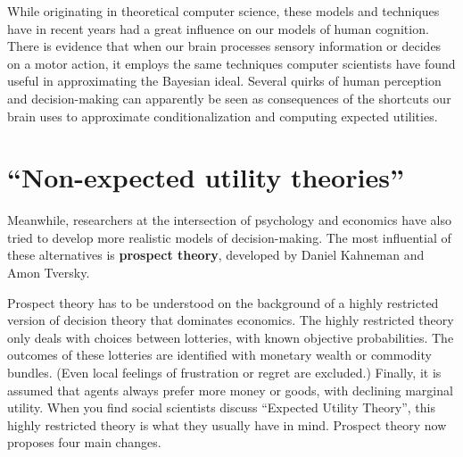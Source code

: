 While originating in theoretical computer science, these models and
techniques have in recent years had a great influence on our models of
human cognition. There is evidence that when our brain processes
sensory information or decides on a motor action, it employs the same
techniques computer scientists have found useful in approximating the
Bayesian ideal. Several quirks of human perception and decision-making
can apparently be seen as consequences of the shortcuts our brain uses
to approximate conditionalization and computing expected utilities.%



\section{``Non-expected utility theories''}

Meanwhile, researchers at the intersection of psychology and economics
have also tried to develop more realistic models of
decision-making. The most influential of these alternatives is
\textbf{prospect theory}, developed by Daniel Kahneman and Amon
Tversky.

Prospect theory has to be understood on the background of a highly
restricted version of decision theory that dominates economics. The
highly restricted theory only deals with choices between lotteries,
with known objective probabilities. The outcomes of these lotteries
are identified with monetary wealth or commodity bundles. (Even local
feelings of frustration or regret are excluded.)  Finally, it is
assumed that agents always prefer more money or goods, with declining
marginal utility. When you find social scientists discuss ``Expected
Utility Theory'', this highly restricted theory is what they usually
have in mind. Prospect theory now proposes four main changes.

